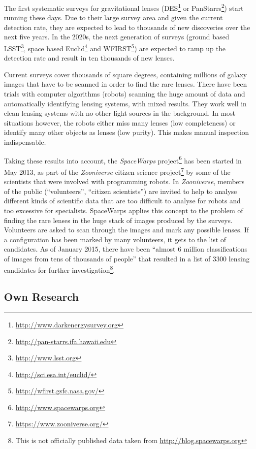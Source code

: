 \documentclass[11pt]{article}
\begin{document}
The first systematic surveys for gravitational lenses (DES\footnote{\url{http://www.darkenergysurvey.org}} or PanStarrs\footnote{\url{http://pan-starrs.ifa.hawaii.edu}}) start running these days.
Due to their large survey area and given the current detection rate, they are expected to lead to thousands of new discoveries over the next five years.
In the 2020s, the next generation of surveys (ground based LSST\footnote{\url{http://www.lsst.org}}, space based Euclid\footnote{\url{http://sci.esa.int/euclid/}} and WFIRST\footnote{\url{http://wfirst.gsfc.nasa.gov/}}) are expected to ramp up the detection rate and result in ten thousands of new lenses.

Current surveys cover thousands of square degrees, containing millions of galaxy images that have to be scanned in order to find the rare lenses.
There have been trials with computer algorithms (robots) scanning the huge amount of data and automatically identifying lensing systems\cite{robots}, with mixed results.
They work well in clean lensing systems with no other light sources in the background.
In most situations however, the robots either miss many lenses (low completeness) or identify many other objects as lenses (low purity).
This makes manual inspection indispensable.

Taking these results into account, the \emph{SpaceWarps} project\footnote{\url{http://www.spacewarps.org}} has been started in May 2013, as part of the \emph{Zooniverse} citizen science project\footnote{\url{https://www.zooniverse.org/}} by some of the scientists that were involved with programming robots.
In \emph{Zooniverse}, members of the public (``volunteers'', ``citizen scientists'') are invited to help to analyse different kinds of scientific data that are too difficult to analyse for robots and too excessive for specialists.
SpaceWarps applies this concept to the problem of finding the rare lenses in the huge stack of images produced by the surveys.
Volunteers are asked to scan through the images and mark any possible lenses.
If a configuration has been marked by many volunteers, it gets to the list of candidates.
As of January 2015, there have been ``almost 6 million classifications of images from tens of thousands of people'' that resulted in a list of 3300 lensing candidates for further investigation\footnote{This is not officially published data taken from \url{http://blog.spacewarps.org}}.



\subsection{Own Research}
\end{document}
